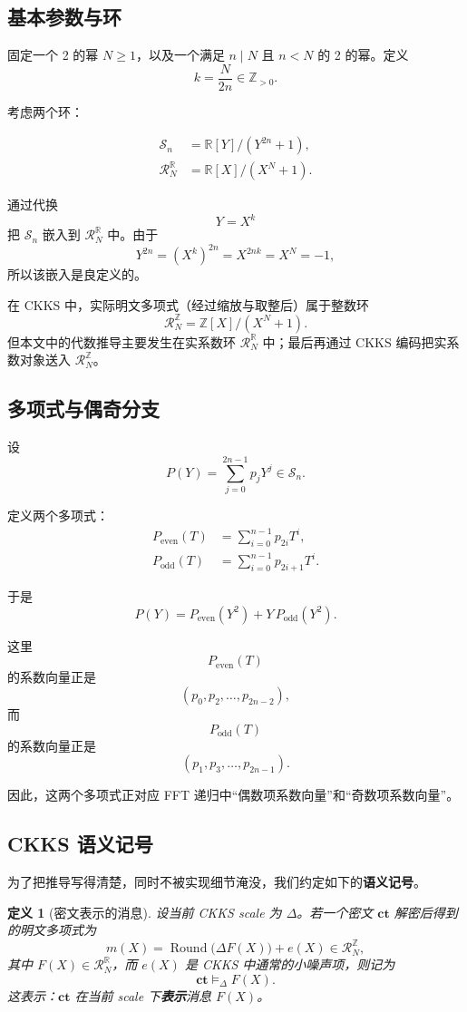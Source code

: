 \documentclass[11pt,a4paper]{ctexart}
\newcommand{\RR}{\mathbb{R}}
\newcommand{\ZZ}{\mathbb{Z}}
\newcommand{\Round}{\operatorname{Round}}
\newcommand{\ct}{\mathbf{ct}}
\newcommand{\Rbig}{\mathcal{R}_N^{\RR}}
\newcommand{\Rint}{\mathcal{R}_N^{\ZZ}}
\newcommand{\Ssmall}{\mathcal{S}_n}
\newcommand{\rep}{\mathrel{\vDash_{\Delta}}}
\newtheorem{definition}{定义}[section]
\begin{document}
\subsection{基本参数与环}

固定一个 2 的幂 \(N\ge 1\)，以及一个满足 \(n\mid N\) 且 \(n < N\) 的 2 的幂。定义
\[
k=\frac{N}{2n}\in \ZZ_{>0}.
\]

考虑两个环：

\begin{align*}
\Ssmall &= \RR[Y]/(Y^{2n}+1),\\
\Rbig &= \RR[X]/(X^N+1).
\end{align*}

通过代换
\[
Y=X^k
\]
把 \(\Ssmall\) 嵌入到 \(\Rbig\) 中。由于
\[
Y^{2n}=(X^k)^{2n}=X^{2nk}=X^N=-1,
\]
所以该嵌入是良定义的。

在 CKKS 中，实际明文多项式（经过缩放与取整后）属于整数环
\[
\Rint=\ZZ[X]/(X^N+1).
\]
但本文中的代数推导主要发生在实系数环 \(\Rbig\) 中；最后再通过 CKKS 编码把实系数对象送入 \(\Rint\)。

\subsection{多项式与偶奇分支}

设
\[
P(Y)=\sum_{j=0}^{2n-1}p_jY^j \in \Ssmall.
\]

定义两个多项式：
\begin{align}
P_{\mathrm{even}}(T) &= \sum_{i=0}^{n-1}p_{2i}T^i, \label{eq:def-even}\\
P_{\mathrm{odd}}(T) &= \sum_{i=0}^{n-1}p_{2i+1}T^i. \label{eq:def-odd}
\end{align}

于是
\[
P(Y)=P_{\mathrm{even}}(Y^2)+Y\,P_{\mathrm{odd}}(Y^2).
\]

这里
\[
P_{\mathrm{even}}(T)
\]
的系数向量正是
\[
(p_0,p_2,\dots,p_{2n-2}),
\]
而
\[
P_{\mathrm{odd}}(T)
\]
的系数向量正是
\[
(p_1,p_3,\dots,p_{2n-1}).
\]

因此，这两个多项式正对应 FFT 递归中“偶数项系数向量”和“奇数项系数向量”。

\subsection{CKKS 语义记号}

为了把推导写得清楚，同时不被实现细节淹没，我们约定如下的\textbf{语义记号}。

\begin{definition}[密文表示的消息]
设当前 CKKS scale 为 \(\Delta\)。若一个密文 \(\ct\) 解密后得到的明文多项式为
\[
m(X)=\Round\!\bigl(\Delta F(X)\bigr)+e(X)\in \Rint,
\]
其中 \(F(X)\in \Rbig\)，而 \(e(X)\) 是 CKKS 中通常的小噪声项，则记为
\[
\ct \rep F(X).
\]
这表示：\(\ct\) 在当前 scale 下\textbf{表示}消息 \(F(X)\)。
\end{definition}
\end{document}
